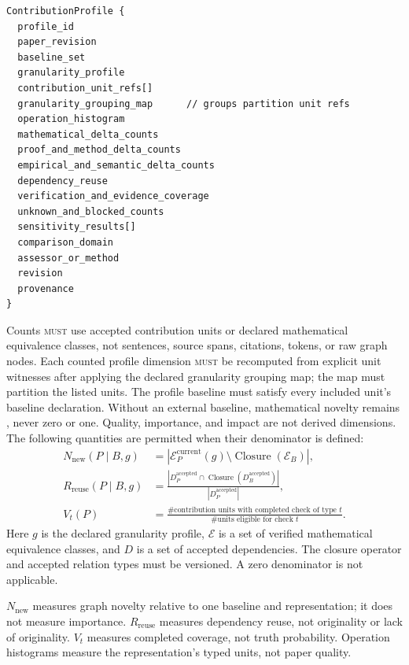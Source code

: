 \begin{lstlisting}[style=interface]
ContributionProfile {
  profile_id
  paper_revision
  baseline_set
  granularity_profile
  contribution_unit_refs[]
  granularity_grouping_map      // groups partition unit refs
  operation_histogram
  mathematical_delta_counts
  proof_and_method_delta_counts
  empirical_and_semantic_delta_counts
  dependency_reuse
  verification_and_evidence_coverage
  unknown_and_blocked_counts
  sensitivity_results[]
  comparison_domain
  assessor_or_method
  revision
  provenance
}
\end{lstlisting}

Counts \textsc{must} use accepted contribution units or declared mathematical equivalence classes, not sentences, source spans, citations, tokens, or raw graph nodes. Each counted profile dimension \textsc{must} be recomputed from explicit unit witnesses after applying the declared granularity grouping map; the map must partition the listed units. The profile baseline must satisfy every included unit's baseline declaration. Without an external baseline, mathematical novelty remains , never zero or one. Quality, importance, and impact are not derived dimensions. The following quantities are permitted when their denominator is defined:
\begin{align}
N_{\mathrm{new}}(P\mid B,g)
  &= \left|\mathcal E_P^{\mathrm{current}}(g)
      \setminus \operatorname{Closure}(\mathcal E_B)\right|,\\
R_{\mathrm{reuse}}(P\mid B,g)
  &= \frac{|D_P^{\mathrm{accepted}}\cap
      \operatorname{Closure}(D_B^{\mathrm{accepted}})|}
      {|D_P^{\mathrm{accepted}}|},\\
V_t(P)
  &= \frac{\#\text{contribution units with completed check of type }t}
      {\#\text{units eligible for check }t}.
\end{align}
Here $g$ is the declared granularity profile, $\mathcal E$ is a set of verified mathematical equivalence classes, and $D$ is a set of accepted dependencies. The closure operator and accepted relation types must be versioned. A zero denominator is not applicable.

$N_{\mathrm{new}}$ measures graph novelty relative to one baseline and representation; it does not measure importance. $R_{\mathrm{reuse}}$ measures dependency reuse, not originality or lack of originality. $V_t$ measures completed coverage, not truth probability. Operation histograms measure the representation's typed units, not paper quality.

